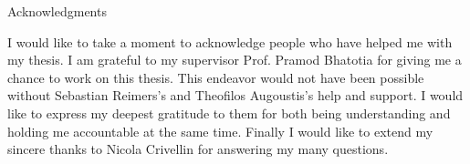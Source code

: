 \thispagestyle{empty}

\vspace*{20mm}

\begin{center}
    { Acknowledgments}
\end{center}

\vspace{10mm}

I would like to take a moment to acknowledge people who have helped me with my thesis.
I am grateful to my supervisor Prof. Pramod Bhatotia for giving me a chance to work on this thesis.
This endeavor would not have been possible without Sebastian Reimers's and Theofilos Augoustis's help and support.
I would like to express my deepest gratitude to them for both being understanding and holding me accountable at the same time.
Finally I would like to extend my sincere thanks to Nicola Crivellin for answering my many questions.





	


	



\cleardoublepage{}
